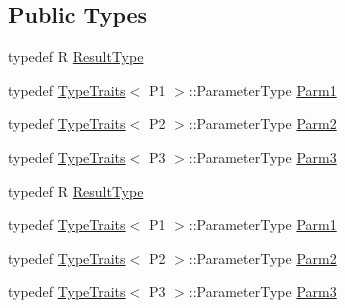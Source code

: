 \subsection*{Public Types}
\begin{DoxyCompactItemize}
\item 
typedef R \mbox{\hyperlink{classUtil_1_1FunctorImpl_3_01R_00_01TYPELIST__3_07P1_00_01P2_00_01P3_08_4_aac45953d9a4169ab320e3832125e5f6b}{Result\+Type}}
\item 
typedef \mbox{\hyperlink{classUtil_1_1TypeTraits}{Type\+Traits}}$<$ P1 $>$\+::Parameter\+Type \mbox{\hyperlink{classUtil_1_1FunctorImpl_3_01R_00_01TYPELIST__3_07P1_00_01P2_00_01P3_08_4_af62467f5d0a091d03f5db9c7fbeb1f96}{Parm1}}
\item 
typedef \mbox{\hyperlink{classUtil_1_1TypeTraits}{Type\+Traits}}$<$ P2 $>$\+::Parameter\+Type \mbox{\hyperlink{classUtil_1_1FunctorImpl_3_01R_00_01TYPELIST__3_07P1_00_01P2_00_01P3_08_4_a0f99a7ea311c3cc8934098ce9fe769c1}{Parm2}}
\item 
typedef \mbox{\hyperlink{classUtil_1_1TypeTraits}{Type\+Traits}}$<$ P3 $>$\+::Parameter\+Type \mbox{\hyperlink{classUtil_1_1FunctorImpl_3_01R_00_01TYPELIST__3_07P1_00_01P2_00_01P3_08_4_a909cd0ef75e4c16e44eb5ae652144d00}{Parm3}}
\item 
typedef R \mbox{\hyperlink{classUtil_1_1FunctorImpl_3_01R_00_01TYPELIST__3_07P1_00_01P2_00_01P3_08_4_aac45953d9a4169ab320e3832125e5f6b}{Result\+Type}}
\item 
typedef \mbox{\hyperlink{classUtil_1_1TypeTraits}{Type\+Traits}}$<$ P1 $>$\+::Parameter\+Type \mbox{\hyperlink{classUtil_1_1FunctorImpl_3_01R_00_01TYPELIST__3_07P1_00_01P2_00_01P3_08_4_af62467f5d0a091d03f5db9c7fbeb1f96}{Parm1}}
\item 
typedef \mbox{\hyperlink{classUtil_1_1TypeTraits}{Type\+Traits}}$<$ P2 $>$\+::Parameter\+Type \mbox{\hyperlink{classUtil_1_1FunctorImpl_3_01R_00_01TYPELIST__3_07P1_00_01P2_00_01P3_08_4_a0f99a7ea311c3cc8934098ce9fe769c1}{Parm2}}
\item 
typedef \mbox{\hyperlink{classUtil_1_1TypeTraits}{Type\+Traits}}$<$ P3 $>$\+::Parameter\+Type \mbox{\hyperlink{classUtil_1_1FunctorImpl_3_01R_00_01TYPELIST__3_07P1_00_01P2_00_01P3_08_4_a909cd0ef75e4c16e44eb5ae652144d00}{Parm3}}
\end{DoxyCompactItemize}
